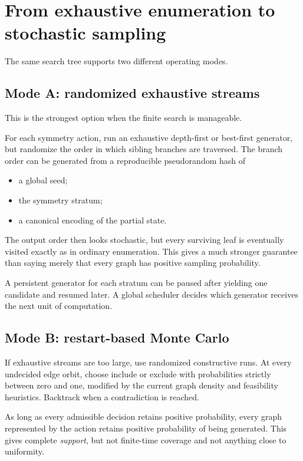 \documentclass[11pt]{article}
\begin{document}
\section{From exhaustive enumeration to stochastic sampling}

The same search tree supports two different operating modes.

\subsection{Mode A: randomized exhaustive streams}

This is the strongest option when the finite search is manageable.

For each symmetry action, run an exhaustive depth-first or best-first generator, but randomize the order in which sibling branches are traversed. The branch order can be generated from a reproducible pseudorandom hash of
\begin{itemize}
  \item a global seed;
  \item the symmetry stratum;
  \item a canonical encoding of the partial state.
\end{itemize}

The output order then looks stochastic, but every surviving leaf is eventually visited exactly as in ordinary enumeration. This gives a much stronger guarantee than saying merely that every graph has positive sampling probability.

A persistent generator for each stratum can be paused after yielding one candidate and resumed later. A global scheduler decides which generator receives the next unit of computation.

\subsection{Mode B: restart-based Monte Carlo}

If exhaustive streams are too large, use randomized constructive runs. At every undecided edge orbit, choose include or exclude with probabilities strictly between zero and one, modified by the current graph density and feasibility heuristics. Backtrack when a contradiction is reached.

As long as every admissible decision retains positive probability, every graph represented by the action retains positive probability of being generated. This gives complete \emph{support}, but not finite-time coverage and not anything close to uniformity.
\end{document}
